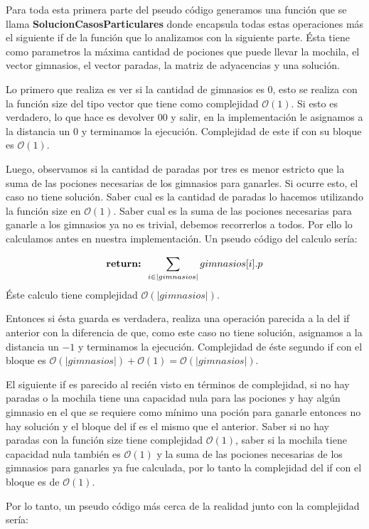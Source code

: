 Para toda esta primera parte del pseudo código generamos una función que se llama \textbf{SolucionCasosParticulares} donde encapsula todas estas operaciones más el siguiente if de la función que lo analizamos con la siguiente parte. Ésta tiene como parametros la máxima cantidad de pociones que puede llevar la mochila, el vector gimnasios, el vector paradas, la matriz de adyacencias y una solución.

Lo primero que realiza es ver si la cantidad de gimnasios es $0$, esto se realiza con la función size del tipo vector que tiene como complejidad $\mathcal{O}(1)$. Si esto es verdadero, lo que hace es devolver $0 0$ y salir, en la implementación le asignamos a la distancia un $0$ y terminamos la ejecución. Complejidad de este if con su bloque es $\mathcal{O}(1)$.

Luego, observamos si la cantidad de paradas por tres es menor estricto que la suma de las pociones necesarias de los gimnasios para ganarles. Si ocurre esto, el caso no tiene solución. Saber cual es la cantidad de paradas lo hacemos utilizando la función size en $\mathcal{O}(1)$. Saber cual es la suma de las pociones necesarias para ganarle a los gimnasios ya no es trivial, debemos recorrerlos a todos. Por ello lo calculamos antes en nuestra implementación. Un pseudo código del calculo sería:

\[
	\text{\textbf{return: }} \sum_{i \in |gimnasios|} gimnasios[i].p
\]
Éste calculo tiene complejidad $\mathcal{O}(|gimnasios|)$.

Entonces si ésta guarda es verdadera, realiza una operación parecida a la del if anterior con la diferencia de que, como este caso no tiene solución, asignamos a la distancia un $-1$ y terminamos la ejecución. Complejidad de éste segundo if con el bloque es $\mathcal{O}(|gimnasios|) + \mathcal{O}(1) = \mathcal{O}(|gimnasios|)$.

El siguiente if es parecido al recién visto en términos de complejidad, si no hay paradas o la mochila tiene una capacidad nula para las pociones y hay algún gimnasio en el que se requiere como mínimo una poción para ganarle entonces no hay solución y el bloque del if es el mismo que el anterior. Saber si no hay paradas con la función size tiene complejidad $\mathcal{O}(1)$, saber si la mochila tiene capacidad nula también es $\mathcal{O}(1)$ y la suma de las pociones necesarias de los gimnasios para ganarles ya fue calculada, por lo tanto la complejidad del if con el bloque es de $\mathcal{O}(1)$.

Por lo tanto, un pseudo código  más cerca de la realidad junto con la complejidad sería:

